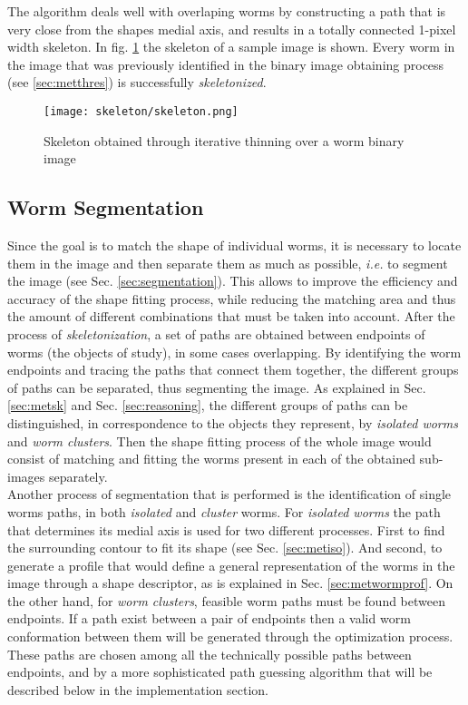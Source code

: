 The algorithm deals well with overlaping worms by constructing a path that is very close
from the shapes medial axis, and results in a totally connected 1-pixel width skeleton.
In fig. \ref{fig:skeleton} the skeleton of a sample image is shown. Every worm in the 
image that was previously identified in the binary image obtaining process 
(see \ref{sec:metthres}) is successfully \emph{skeletonized}.

\begin{figure}[h t b p ! H]
 \centering
   \texttt{[image: skeleton/skeleton.png]}
 \caption{Skeleton obtained through iterative thinning over a worm binary image}
\label{fig:skeleton}
\end{figure} 


\subsection{Worm Segmentation}
\label{sec:metsegmentation}

Since the goal is to match the shape of individual worms,
it is necessary to locate them in the image and then separate them 
as much as possible, \emph{i.e.} to segment the image (see Sec. \ref{sec:segmentation}). 
This allows to improve the efficiency and accuracy of the 
shape fitting process, while reducing the matching area and thus the amount of 
different combinations that must be taken into account. After the process of 
\emph{skeletonization}, a set of paths are obtained 
between endpoints of worms (the objects of study), in some cases overlapping. 
By identifying the worm endpoints and tracing the paths that connect them together,
the different groups of paths can be separated, thus segmenting the image.
As explained in Sec. \ref{sec:metsk} and Sec. \ref{sec:reasoning}, the different groups
of paths can be distinguished, in correspondence to the objects they represent,
by \emph{isolated worms} and \emph{worm clusters}. Then the shape fitting process
of the whole image would consist of matching and fitting the worms present in each of
the obtained sub-images separately.\\

Another process of segmentation that is performed is the identification of single
worms paths, in both \emph{isolated} and \emph{cluster} worms. For \emph{isolated worms}
the path that determines its medial axis is used for two different processes. 
First to find the surrounding contour to
fit its shape (see Sec. \ref{sec:metiso}). And second, to generate a profile that 
would define a general representation of the worms in the image through a shape
descriptor, as is explained in Sec. \ref{sec:metwormprof}.
On the other hand, for \emph{worm clusters}, feasible worm paths must be found between endpoints. 
If a path exist between a pair of endpoints then a valid worm conformation between them will
be generated through the optimization process.
These paths are chosen among all the technically possible paths between endpoints, and by
a more sophisticated path guessing algorithm that will be described below in the
implementation section.


